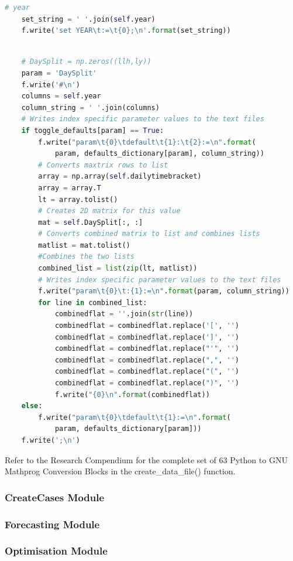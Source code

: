 \documentclass[12pt]{article}
\begin{document}
\begin{lstlisting}[language=Python,label = {lst:ODSPGCB},caption = {One Dimensional Set Python to GNU Mathprog Conversion Block}]
	# year
	set_string = ' '.join(self.year)
	f.write('set YEAR\t:=\t{0};\n'.format(set_string))
\end{lstlisting}

\begin{lstlisting}[language=Python,label = {lst:TDCPGCB},caption = Two Dimensional Parameter Python to GNU Mathprog Conversion Block]

	# DaySplit = np.zeros((llh,ly))
	param = 'DaySplit'
	f.write('#\n')
	columns = self.year
	column_string = ' '.join(columns)
	# Writes index specific parameter values to the text files
	if toggle_defaults[param] == True:
		f.write("param\t{0}\tdefault\t{1}:\t{2}:=\n".format(
			param, defaults_dictionary[param], column_string))
		# Converts maxtrix rows to list
		array = np.array(self.dailytimebracket)
		array = array.T
		lt = array.tolist()
		# Creates 2D matrix for this value
		mat = self.DaySplit[:, :]
		# Converts combined matrix to list and combines lists
		matlist = mat.tolist()
		#Combines the two lists
		combined_list = list(zip(lt, matlist))
		# Writes index specific parameter values to the text files
		f.write("param\t{0}\t:{1}:=\n".format(param, column_string))
		for line in combined_list:
			combinedflat = ''.join(str(line))
			combinedflat = combinedflat.replace('[', '')
			combinedflat = combinedflat.replace(']', '')
			combinedflat = combinedflat.replace("'", '')
			combinedflat = combinedflat.replace(",", '')
			combinedflat = combinedflat.replace("(", '')
			combinedflat = combinedflat.replace(")", '')
			f.write("{0}\n".format(combinedflat))
	else:
		f.write("param\t{0}\tdefault\t{1}:=\n".format(
			param, defaults_dictionary[param]))
	f.write(';\n')
\end{lstlisting}
Refer to the Research Compendium for the complete set of 63 Python to GNU Mathprog Conversion Blocks in the create\_data\_file() function.

\subsubsection{CreateCases Module}


\subsubsection{Forecasting Module}

\subsubsection{Optimisation Module}
\end{document}
